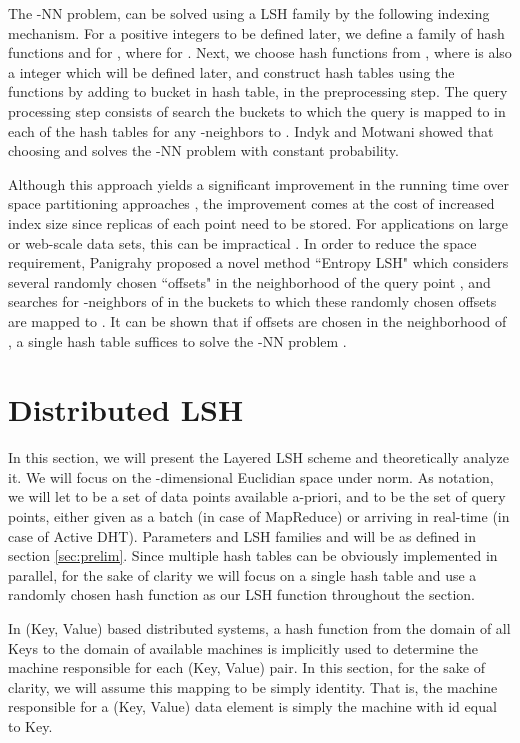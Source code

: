 \documentclass{acm_proc_article-sp}
\numberwithin{equation}{section}
\numberwithin{figure}{section}
\begin{document}
{The -NN problem, can be solved using a LSH family  by the following indexing mechanism. For a positive integers  to be defined later, we define a family of hash functions  and for ,  where  for .  Next, 
we choose  hash functions  from , where  is also a integer which will be defined later, and construct  hash tables using the functions  by adding  to bucket  in  hash table,  in the preprocessing step. The query processing step consists of search the buckets to which the query  is  mapped to in each of the  hash tables for any -neighbors to . Indyk and Motwani showed that choosing  and  solves the -NN problem with constant probability. 


Although this approach yields a significant improvement in the running time over space partitioning approaches \cite{gim99}, the improvement comes at the cost of increased index size since  replicas of each point need to be stored. For applications on large or web-scale data sets, this can be impractical \cite{Charikar:multiprobe, P06}. In order to reduce the space requirement, Panigrahy proposed a novel method ``Entropy LSH" which considers several randomly chosen ``offsets" in the neighborhood of the query point , and searches for -neighbors of  in the buckets to which these randomly chosen offsets are mapped to \cite{P06}. It can be shown that if  offsets are chosen in the neighborhood of , a single hash table suffices to solve the -NN problem \cite{P06}.

}

\section{Distributed LSH}
\label{sec:distlsh}

In this section, we will present the Layered LSH scheme and theoretically analyze it. We will focus on the -dimensional Euclidian space under  norm. As notation, we will let  to be a set of  data points available a-priori, and  to be the set of query points, either given as a batch (in case of MapReduce) or arriving in real-time (in case of Active DHT). Parameters  and LSH families  and  will be as defined in section \ref{sec:prelim}. Since multiple hash tables can be obviously implemented in parallel, for the sake of clarity we will focus on a single hash table and use a randomly chosen hash function  as our LSH function throughout the section. 



In (Key, Value) based distributed systems, a hash function from the domain of all Keys to the domain of available machines is implicitly used to determine the machine responsible for each (Key, Value) pair. In this section, for the sake of clarity, we will assume this mapping to be simply identity. That is, the machine responsible for a (Key, Value) data element is simply the machine with id equal to Key.
\end{document}
